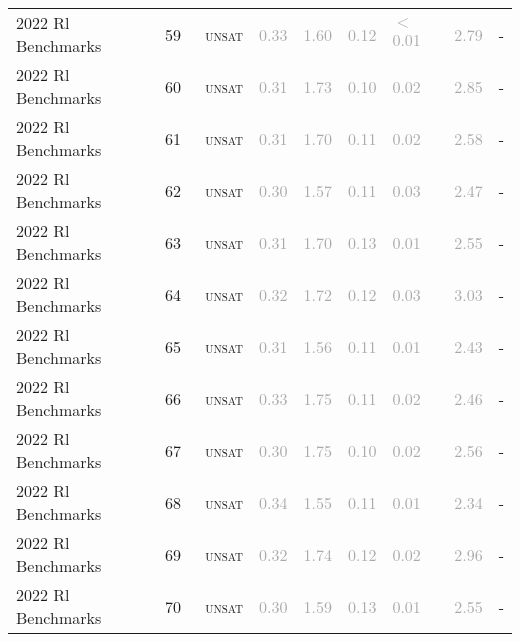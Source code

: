 \begin{center}
{\begin{longtable}{@{}lllllllll@{}}
2022 Rl Benchmarks & 59 & ~\textsc{unsat} & \textcolor{darkgray}{0.33} & \textcolor{darkgray}{1.60} & \textcolor{darkgray}{0.12} & \textcolor{darkgray}{$<$0.01} & \textcolor{darkgray}{2.79} & - \\
2022 Rl Benchmarks & 60 & ~\textsc{unsat} & \textcolor{darkgray}{0.31} & \textcolor{darkgray}{1.73} & \textcolor{darkgray}{0.10} & \textcolor{darkgray}{0.02} & \textcolor{darkgray}{2.85} & - \\
2022 Rl Benchmarks & 61 & ~\textsc{unsat} & \textcolor{darkgray}{0.31} & \textcolor{darkgray}{1.70} & \textcolor{darkgray}{0.11} & \textcolor{darkgray}{0.02} & \textcolor{darkgray}{2.58} & - \\
2022 Rl Benchmarks & 62 & ~\textsc{unsat} & \textcolor{darkgray}{0.30} & \textcolor{darkgray}{1.57} & \textcolor{darkgray}{0.11} & \textcolor{darkgray}{0.03} & \textcolor{darkgray}{2.47} & - \\
2022 Rl Benchmarks & 63 & ~\textsc{unsat} & \textcolor{darkgray}{0.31} & \textcolor{darkgray}{1.70} & \textcolor{darkgray}{0.13} & \textcolor{darkgray}{0.01} & \textcolor{darkgray}{2.55} & - \\
2022 Rl Benchmarks & 64 & ~\textsc{unsat} & \textcolor{darkgray}{0.32} & \textcolor{darkgray}{1.72} & \textcolor{darkgray}{0.12} & \textcolor{darkgray}{0.03} & \textcolor{darkgray}{3.03} & - \\
2022 Rl Benchmarks & 65 & ~\textsc{unsat} & \textcolor{darkgray}{0.31} & \textcolor{darkgray}{1.56} & \textcolor{darkgray}{0.11} & \textcolor{darkgray}{0.01} & \textcolor{darkgray}{2.43} & - \\
2022 Rl Benchmarks & 66 & ~\textsc{unsat} & \textcolor{darkgray}{0.33} & \textcolor{darkgray}{1.75} & \textcolor{darkgray}{0.11} & \textcolor{darkgray}{0.02} & \textcolor{darkgray}{2.46} & - \\
2022 Rl Benchmarks & 67 & ~\textsc{unsat} & \textcolor{darkgray}{0.30} & \textcolor{darkgray}{1.75} & \textcolor{darkgray}{0.10} & \textcolor{darkgray}{0.02} & \textcolor{darkgray}{2.56} & - \\
2022 Rl Benchmarks & 68 & ~\textsc{unsat} & \textcolor{darkgray}{0.34} & \textcolor{darkgray}{1.55} & \textcolor{darkgray}{0.11} & \textcolor{darkgray}{0.01} & \textcolor{darkgray}{2.34} & - \\
2022 Rl Benchmarks & 69 & ~\textsc{unsat} & \textcolor{darkgray}{0.32} & \textcolor{darkgray}{1.74} & \textcolor{darkgray}{0.12} & \textcolor{darkgray}{0.02} & \textcolor{darkgray}{2.96} & - \\
2022 Rl Benchmarks & 70 & ~\textsc{unsat} & \textcolor{darkgray}{0.30} & \textcolor{darkgray}{1.59} & \textcolor{darkgray}{0.13} & \textcolor{darkgray}{0.01} & \textcolor{darkgray}{2.55} & - \\

\end{longtable}}
\end{center}
